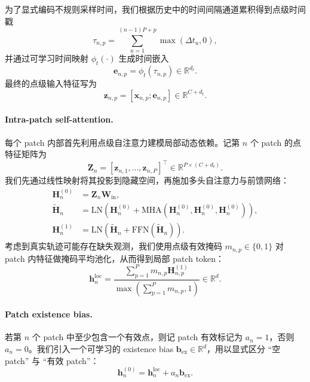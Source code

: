 为了显式编码不规则采样时间，我们根据历史中的时间间隔通道累积得到点级时间戳
\begin{equation}
\tau_{n,p} = \sum_{u=1}^{(n-1)P+p} \max(\Delta t_u, 0),
\end{equation}
并通过可学习时间映射 $\phi_t(\cdot)$ 生成时间嵌入
\begin{equation}
\bm{e}_{n,p} = \phi_t(\tau_{n,p}) \in \mathbb{R}^{d_t}.
\end{equation}
最终的点级输入特征写为
\begin{equation}
\bm{z}_{n,p} = [\bm{x}_{n,p}; \bm{e}_{n,p}] \in \mathbb{R}^{C + d_t}.
\end{equation}

\paragraph{Intra-patch self-attention.}
每个 patch 内部首先利用点级自注意力建模局部动态依赖。记第 $n$ 个 patch 的点特征矩阵为
\begin{equation}
\bm{Z}_n = [\bm{z}_{n,1}, \dots, \bm{z}_{n,P}]^\top \in \mathbb{R}^{P \times (C+d_t)}.
\end{equation}
我们先通过线性映射将其投影到隐藏空间，再施加多头自注意力与前馈网络：
\begin{align}
\bm{H}_n^{(0)} &= \bm{Z}_n \bm{W}_{\mathrm{in}}, \\
\tilde{\bm{H}}_n &= \mathrm{LN}\!\left(\bm{H}_n^{(0)} + \mathrm{MHA}\!\left(\bm{H}_n^{(0)}, \bm{H}_n^{(0)}, \bm{H}_n^{(0)}\right)\right), \\
\bm{H}_n^{(1)} &= \mathrm{LN}\!\left(\tilde{\bm{H}}_n + \mathrm{FFN}\!\left(\tilde{\bm{H}}_n\right)\right).
\end{align}
考虑到真实轨迹可能存在缺失观测，我们使用点级有效掩码 $m_{n,p} \in \{0,1\}$ 对 patch 内特征做掩码平均池化，从而得到局部 patch token：
\begin{equation}
\bm{h}_n^{\mathrm{loc}} =
\frac{\sum_{p=1}^{P} m_{n,p} \bm{H}_{n,p}^{(1)}}
{\max\!\left(\sum_{p=1}^{P} m_{n,p}, 1\right)}
\in \mathbb{R}^{d}.
\end{equation}

\paragraph{Patch existence bias.}
若第 $n$ 个 patch 中至少包含一个有效点，则记 patch 有效标记为 $a_n = 1$，否则 $a_n = 0$。我们引入一个可学习的 existence bias $\bm{b}_{\mathrm{ex}} \in \mathbb{R}^{d}$，用以显式区分 ``空 patch'' 与 ``有效 patch''：
\begin{equation}
\bm{h}_n^{(0)} = \bm{h}_n^{\mathrm{loc}} + a_n \bm{b}_{\mathrm{ex}}.
\end{equation}

